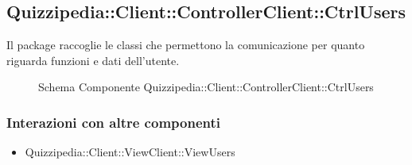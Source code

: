 \subsection{Quizzipedia::Client::ControllerClient::CtrlUsers}
Il package raccoglie le classi che permettono la comunicazione per quanto riguarda funzioni e dati dell'utente.
\begin{figure}[H]
\centering
\noindent{}
\caption[Quizzipedia::Client::ControllerClient::CtrlUsers]{Schema Componente Quizzipedia::Client::ControllerClient::CtrlUsers}
\end{figure}
\subsubsection{Interazioni con altre componenti}
\begin{itemize}
\item Quizzipedia::Client::ViewClient::ViewUsers
\end{itemize}
